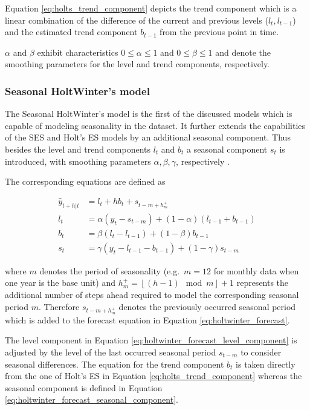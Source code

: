 Equation \ref{eq:holts_trend_component} depicts the trend component which is a linear combination of the difference of the current and previous levels ($l_t, l_{t-1}$) and the estimated trend component $b_{t-1}$ from the previous point in time. 

$\alpha$ and $\beta$ exhibit characteristics $0 \le \alpha \le 1$ and $0 \le \beta \le 1$ and denote the smoothing parameters for the level and trend components, respectively.

\subsubsection{Seasonal HoltWinter's model}

The Seasonal HoltWinter's model is the first of the discussed models which is capable of modeling seasonality in the dataset. It further extends the capabilities of the SES and Holt's ES models by an additional seasonal component. Thus besides the level and trend components $l_t$ and $b_t$ a seasonal component $s_t$ is introduced, with smoothing parameters $\alpha, \beta, \gamma$, respectively \cite{hyndman2012forecasting}. 

The corresponding equations are defined as

\begin{align}
 \hat{y}_{t+h|t} &= l_t + h b_t + s_{t-m+h_m^+} \label{eq:holtwinter_forecast} \\
 l_t &= \alpha (y_t - s_{t-m}) + (1 - \alpha) (l_{t-1} + b_{t-1})\label{eq:holtwinter_forecast_level_component} \\
 b_t &= \beta (l_t - l_{t-1}) + (1 - \beta) b_{t-1}\label{eq:holtwinter_forecast_trend_component} \\
 s_t &= \gamma (y_t - l_{t-1} - b_{t-1}) + (1 - \gamma) s_{t-m}\label{eq:holtwinter_forecast_seasonal_component}
\end{align}

where $m$ denotes the period of seasonality (e.g.~$m=12$ for monthly data when one year is the base unit) and $h_m^+ = \left\lfloor (h-1) \mod m\right\rfloor + 1$ represents the additional number of steps ahead required to model the corresponding seasonal period $m$. Therefore $s_{t-m+h_m^+}$ denotes the previously occurred seasonal period which is added to the forecast equation in Equation \ref{eq:holtwinter_forecast}. 

The level component in Equation \ref{eq:holtwinter_forecast_level_component} is adjusted by the level of the last occurred seasonal period $s_{t-m}$ to consider seasonal differences. The equation for the trend component $b_t$ is taken directly from the one of Holt's ES in Equation \ref{eq:holts_trend_component} whereas the seasonal component is defined in Equation \ref{eq:holtwinter_forecast_seasonal_component}. 

